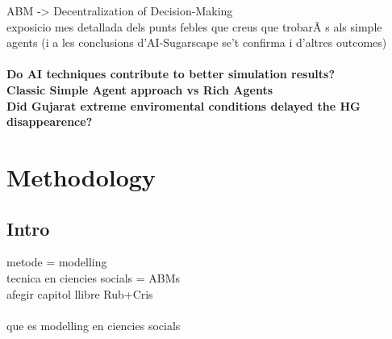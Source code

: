 \documentclass{report}
\begin{document}
ABM -> Decentralization of Decision-Making
\\
exposicio mes detallada dels punts febles que creus que trobarÃ s als simple agents (i a les conclusions d'AI-Sugarscape se't confirma 
i d'altres outcomes)
\\
\\
\indent \textbf{Do AI techniques contribute to better simulation results?}\\
\indent \textbf{Classic Simple Agent approach vs Rich Agents}\\
\indent \textbf{Did Gujarat extreme enviromental conditions delayed the HG disappearence?}\\
\newpage 
\chapter{Methodology}




\section{Intro}

metode = modelling\\
tecnica en ciencies socials = ABMs \\
afegir capitol llibre Rub+Cris\\
\\
que es modelling en ciencies socials 
\\
\end{document}
